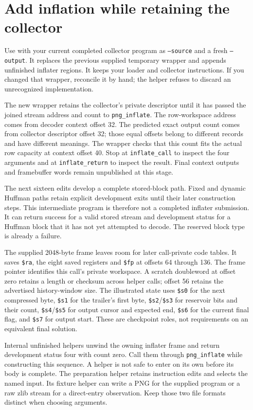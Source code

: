 \section{Add inflation while retaining the collector}
Use  with your current completed
collector program as \texttt{--source} and a fresh \texttt{--output}. It replaces the
previous supplied temporary wrapper and appends unfinished inflater regions. It keeps
your loader and collector instructions. If you changed that wrapper, reconcile it by
hand; the helper refuses to discard an unrecognized implementation.

The new wrapper retains the collector's private descriptor until it has passed the
joined stream address and count to \texttt{png\_inflate}. The row-workspace address
comes from decoder context offset 32. The predicted exact output count comes from
collector descriptor offset 32; those equal offsets belong to different records and
have different meanings. The wrapper checks that this count fits the actual row capacity
at context offset 40. Stop at \texttt{inflate\_call} to inspect the four arguments and
at \texttt{inflate\_return} to inspect the result. Final context outputs and framebuffer
words remain unpublished at this stage.

The next sixteen edits develop a complete stored-block path. Fixed and dynamic Huffman
paths retain explicit development exits until their later construction steps. This
intermediate program is therefore not a completed inflater submission. It can return
success for a valid stored stream and development status for a Huffman block that it
has not yet attempted to decode. The reserved block type is already a failure.

The supplied 2048-byte frame leaves room for later call-private code tables. It saves
\texttt{\$ra}, the eight saved registers and \texttt{\$fp} at offsets 64 through 136.
The frame pointer identifies this call's private workspace. A scratch doubleword at
offset zero retains a length or checksum across helper calls; offset 56 retains the
advertised history-window size. The illustrated state uses \texttt{\$s0} for the next
compressed byte, \texttt{\$s1} for the trailer's first byte, \texttt{\$s2}/\texttt{\$s3}
for reservoir bits and their count, \texttt{\$s4}/\texttt{\$s5} for output cursor and
expected end, \texttt{\$s6} for the current final flag, and \texttt{\$s7} for output
start. These are checkpoint roles, not requirements on an equivalent final solution.

Internal unfinished helpers unwind the owning inflater frame and return development
status four with count zero. Call them through \texttt{png\_inflate} while constructing
this sequence. A helper is not safe to enter on its own before its body is complete.
The preparation helper retains instruction edits and selects the named input. Its
fixture helper can write a PNG for the supplied program or a raw zlib stream for a
direct-entry observation. Keep those two file formats distinct when choosing arguments.
